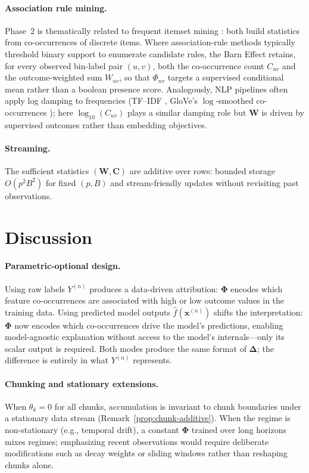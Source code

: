 \documentclass[11pt]{article}
\begin{document}
\paragraph{Association rule mining.}
Phase~2 is thematically related to frequent itemset mining \cite{Agrawal1994}: both build statistics from co-occurrences of discrete items.
Where association-rule methods typically threshold binary support to enumerate candidate rules, the Barn Effect retains, for every observed bin-label pair $(u,v)$, both the co-occurrence count $C_{uv}$ and the outcome-weighted sum $W_{uv}$, so that $\Phi_{uv}$ targets a supervised conditional mean rather than a boolean presence score.
Analogously, NLP pipelines often apply log damping to frequencies (TF--IDF \cite{SparckJones1972}, GloVe's $\log$-smoothed co-occurrences \cite{Pennington2014}); here $\log_{10}(C_{uv})$ plays a similar damping role but $\bm{W}$ is driven by supervised outcomes rather than embedding objectives.

\paragraph{Streaming.}
The sufficient statistics $(\bm{W}, \bm{C})$ are additive over rows: bounded storage $O(p^2 B^2)$ for fixed $(p,B)$ and stream-friendly updates \cite{Gama2014,Bifet2018} without revisiting past observations.

\section{Discussion}
\label{sec:discussion}

\paragraph{Parametric-optional design.}
Using raw labels $Y^{(n)}$ produces a data-driven attribution: $\bm{\Phi}$ encodes which feature co-occurrences are associated with high or low outcome values in the training data.
Using predicted model outputs $\hat{f}(\bm{x}^{(n)})$ shifts the interpretation: $\bm{\Phi}$ now encodes which co-occurrences drive the model's predictions, enabling model-agnostic explanation without access to the model's internals---only its scalar output is required.
Both modes produce the same format of $\bm{\Delta}$; the difference is entirely in what $Y^{(n)}$ represents.

\paragraph{Chunking and stationary extensions.}
When $\theta_k = 0$ for all chunks, accumulation is invariant to chunk boundaries under a stationary data stream (Remark~\ref{prop:chunk-additive}).
When the regime is non-stationary (e.g., temporal drift), a constant $\bm{\Phi}$ trained over long horizons mixes regimes; emphasizing recent observations would require deliberate modifications such as decay weights or sliding windows rather than reshaping chunks alone.
\end{document}
